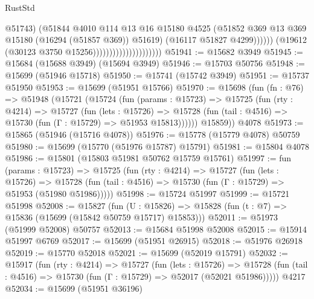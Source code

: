 \begin{lexlean}{RustStd}
\begin{coremodule}
                                                    @51743)
                                                  (@51844
                                                    @4010
                                                    @114
                                                    @13
                                                    @16
                                                    @15180
                                                    @4525
                                                    (@51852
                                                      @369
                                                      @13
                                                      @369
                                                      @15180
                                                      (@16294 (@51857 @369))
                                                      @51619)
                                                    (@16117 @51827 @4299))))))
                                          (@19612 (@30123 @3750 @15256)))))))))))))))))))))
@51941 := @15682 @3949
@51945 := @15684 (@15688 @3949) (@15694 @3949)
@51946 := @15703 @50756
@51948 := @15699 (@51946 @15718)
@51950 := @15741 (@15742 @3949)
@51951 := @15737 @51950
@51953 := @15699 (@51951 @15766)
@51970 := @15698
    (fun (fn : @76) =>
    @51948
      (@15721
        (@15724
          (fun (params : @15723) =>
          @15725
            (fun (rty : @4214) =>
            @15727
              (fun (lets : @15726) =>
              @15728 (fun (tail : @4516) => @15730 (fun (Γ : @15729) => @51953 @15813))))))
        @15859))
    @4078
@51973 := @15865 (@51946 (@15716 @4078))
@51976 := @15778 (@15779 @4078) @50759
@51980 := @15699 (@15770 (@51976 @15787) @15791)
@51981 := @15804 @4078
@51986 := @15801 (@15803 @51981 @50762 @15759 @15761)
@51997 := fun (params : @15723) =>
  @15725
    (fun (rty : @4214) =>
    @15727
      (fun (lets : @15726) =>
      @15728 (fun (tail : @4516) => @15730 (fun (Γ : @15729) => @51953 (@51980 @51986)))))
@51998 := @15724 @51997
@51999 := @15721 @51998
@52008 := @15827
    (fun (U : @15826) => @15828 (fun (t : @7) => @15836 (@15699 (@15842 @50759 @15717) @15853)))
@52011 := @51973 (@51999 @52008) @50757
@52013 := @15684 @51998 @52008
@52015 := @15914 @51997 @6769
@52017 := @15699 (@51951 @26915)
@52018 := @51976 @26918
@52019 := @15770 @52018
@52021 := @15699 (@52019 @15791)
@52032 := @15917
    (fun (rty : @4214) =>
    @15727
      (fun (lets : @15726) =>
      @15728 (fun (tail : @4516) => @15730 (fun (Γ : @15729) => @52017 (@52021 @51986)))))
    @4217
@52034 := @15699 (@51951 @36196)

\end{coremodule}
\end{lexlean}

